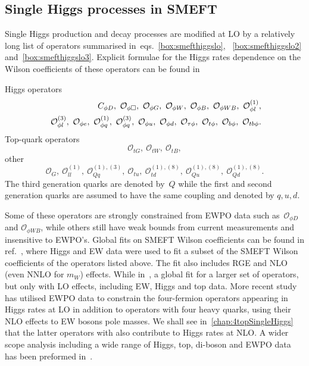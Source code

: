 \subsection{Single Higgs processes in SMEFT}
Single Higgs production and decay processes are modified at LO by a relatively long list of operators summarised in~eqs.~\eqref{box:smefthiggslo}, ~\eqref{box:smefthiggslo2} and~\eqref{box:smefthiggslo3}. Explicit formulae for the Higgs rates dependence on the Wilson coefficients of these operators can be found in~\cite{ATLAS:2019dhi}
\begin{tcolorbox}[title=SMEFT operators modifying Higgs rates at LO,
	title filled=false,
	colback=Mahogany!5!white,
	colframe=Mahogany ]
Higgs operators
	\begin{align}
C_{\phi D}, \ \mathcal{O}_{\phi \Box},\ \mathcal{O}_{\phi G}, \ \mathcal{O}_{\phi W},\ \mathcal{O}_{\phi B}, \ \mathcal{O}_{\phi W B},\ \mathcal{O}_{\phi l}^{(1)}, \nn \\
 \ \mathcal{O}_{\phi l}^{(3)}, \ \mathcal{O}_{\phi e},\ \mathcal{O}_{\phi q}^{(1)},\ \mathcal{O}_{\phi q}^{(3)}, \  \mathcal{O}_{\phi u}, \ \mathcal{O}_{\phi d},\ \mathcal{O}_{\tau \phi}, \ \mathcal{O}_{t \phi}, \ \mathcal{O}_{b \phi},\ \mathcal{O}_{tb \phi}.
 	\label{box:smefthiggslo}
	\end{align}
Top-quark operators
	\begin{equation}
 \mathcal{O}_{t G}, \ \mathcal{O}_{t W}, \ \mathcal{O}_{t B},
 	\label{box:smefthiggslo2}
\end{equation}
other 
	\begin{equation}
	\mathcal{O}_G,\ \mathcal{O}_{ll}^{(1)},\ \mathcal{O}_{Qq}^{(1),(3)},\ \mathcal{O}_{tu},\ \mathcal{O}_{td}^{(1),(8)},\ \mathcal{O}_{Qu}^{(1),(8)}, \ \mathcal{O}_{Qd}^{(1),(8)}.
		\label{box:smefthiggslo3}
\end{equation}
The third generation quarks are denoted by~$Q$ while the first and second generation quarks are assumed to have the same coupling and denoted by $q,u,d$.
\end{tcolorbox}
Some of these operators are strongly constrained from EWPO data such as~$\mathcal{O}_{\phi D}$ and $ \mathcal{O}_{\phi W B}$, while others still have weak bounds from current measurements and insensitive to EWPO's. Global fits on SMEFT Wilson coefficients can be found in ref.~\cite{Dawson:2020oco}, where Higgs and EW data were used to fit a subset of the SMEFT Wilson coefficients of the operators listed above. The fit also includes RGE and NLO (even NNLO for $m_W$) effects. While in~\cite{Ethier:2021bye}, a global fit for a larger set of operators, but only with LO effects, including EW, Higgs and top data.  More recent study~\cite{Dawson:2022bxd} has utilised EWPO data to constrain the four-fermion operators appearing in Higgs rates at LO in addition to operators with four heavy quarks, using their NLO effects to EW bosons pole masses. We shall see in~\autoref{chap:4topSingleHiggs} that the latter operators with also contribute to Higgs rates at NLO. A wider scope analysis including a wide range of Higgs, top, di-boson and EWPO data has been preformed in~\cite{Ellis:2020unq}. \\
